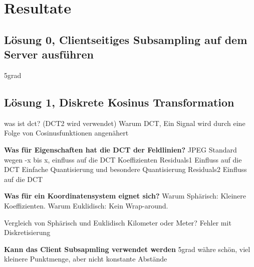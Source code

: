 \section{Resultate}

\subsection{Lösung 0, Clientseitiges Subsampling auf dem Server ausführen }
5grad

\subsection{Lösung 1, Diskrete Kosinus Transformation}
was ist dct? (DCT2 wird verwendet)
Warum DCT, Ein Signal wird durch eine Folge von Cosinusfunktionen angenähert

\textbf{Was für Eigenschaften hat die DCT der Feldlinien?}
JPEG Standard wegen -x bis x, einfluss auf die DCT Koeffizienten
Residuals1 Einfluss auf die DCT
Einfache Quantisierung und besondere Quantisierung
Residuals2 Einfluss auf die DCT


\textbf{Was für ein Koordinatensystem eignet sich?}
Warum Sphärisch: Kleinere Koeffizienten.
Warum Euklidisch: Kein Wrap-around.

Vergleich von Sphärisch und Euklidisch 
Kilometer oder Meter?
Fehler mit Diskretisierung

\textbf{Kann das Client Subsapmling verwendet werden}
5grad währe schön, viel kleinere Punktmenge, aber nicht konstante Abstände
